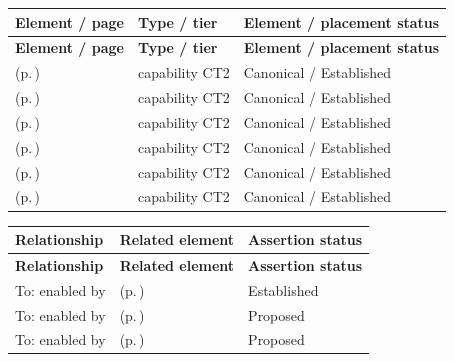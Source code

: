 \begingroup\small\setlength{\TableWidth}{\dimexpr\linewidth-6\tabcolsep-4\arrayrulewidth\relax}
\begin{longtable}{|>{\raggedright\arraybackslash}p{0.52\TableWidth}|>{\raggedright\arraybackslash}p{0.2\TableWidth}|>{\raggedright\arraybackslash}p{0.28\TableWidth}|}
\hline\rowcolor{TableHead}\textbf{Element / page} & \textbf{Type / tier} & \textbf{Element / placement status}\\\hline\endfirsthead
\hline\rowcolor{TableHead}\textbf{Element / page} & \textbf{Type / tier} & \textbf{Element / placement status}\\\hline\endhead
\hline\endfoot
\nameref{cap:bc-individual-health-assessment} (p.\,\pageref{cap:bc-individual-health-assessment}) & capability CT2 & Canonical / Established\\\hline
\nameref{cap:bc-clinical-determination} (p.\,\pageref{cap:bc-clinical-determination}) & capability CT2 & Canonical / Established\\\hline
\nameref{cap:bc-individual-care-planning} (p.\,\pageref{cap:bc-individual-care-planning}) & capability CT2 & Canonical / Established\\\hline
\nameref{cap:bc-clinical-intervention} (p.\,\pageref{cap:bc-clinical-intervention}) & capability CT2 & Canonical / Established\\\hline
\nameref{cap:bc-individual-health-monitoring} (p.\,\pageref{cap:bc-individual-health-monitoring}) & capability CT2 & Canonical / Established\\\hline
\nameref{cap:bc-individual-care-review} (p.\,\pageref{cap:bc-individual-care-review}) & capability CT2 & Canonical / Established\\\hline
\end{longtable}\endgroup

\begingroup\small\setlength{\TableWidth}{\dimexpr\linewidth-6\tabcolsep-4\arrayrulewidth\relax}
\begin{longtable}{|>{\raggedright\arraybackslash}p{0.27\TableWidth}|>{\raggedright\arraybackslash}p{0.48\TableWidth}|>{\raggedright\arraybackslash}p{0.25\TableWidth}|}
\hline\rowcolor{TableHead}\textbf{Relationship} & \textbf{Related element} & \textbf{Assertion status}\\\hline\endfirsthead
\hline\rowcolor{TableHead}\textbf{Relationship} & \textbf{Related element} & \textbf{Assertion status}\\\hline\endhead
\hline\endfoot
To: enabled by & \nameref{cap:bec-health-information-access} (p.\,\pageref{cap:bec-health-information-access}) & Established\\\hline
To: enabled by & \nameref{cap:bec-patient-clinical-record} (p.\,\pageref{cap:bec-patient-clinical-record}) & Proposed\\\hline
To: enabled by & \nameref{cap:bec-care-plan-administration} (p.\,\pageref{cap:bec-care-plan-administration}) & Proposed\\\hline
\end{longtable}\endgroup

